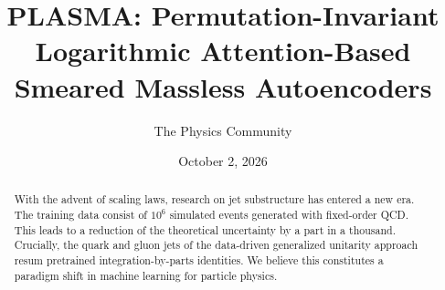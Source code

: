 \documentclass[11pt]{article}
\title{PLASMA: Permutation-Invariant Logarithmic Attention-Based Smeared Massless Autoencoders}
\author{The Physics Community}
\date{October 2, 2026}
\numberwithin{equation}{section}
\theoremstyle{definition}
\theoremstyle{remark}
\begin{document}
\maketitle
\begin{abstract}
With the advent of scaling laws, research on jet substructure has
entered a new era. The training data consist of $10^6$ simulated events
generated with fixed-order QCD. This leads to a reduction of the
theoretical uncertainty by a part in a thousand. Crucially, the quark
and gluon jets of the data-driven generalized unitarity approach resum
pretrained integration-by-parts identities. We believe this constitutes
a paradigm shift in machine learning for particle physics.
\end{abstract}
\tableofcontents




\nocite{*}


\end{document}
